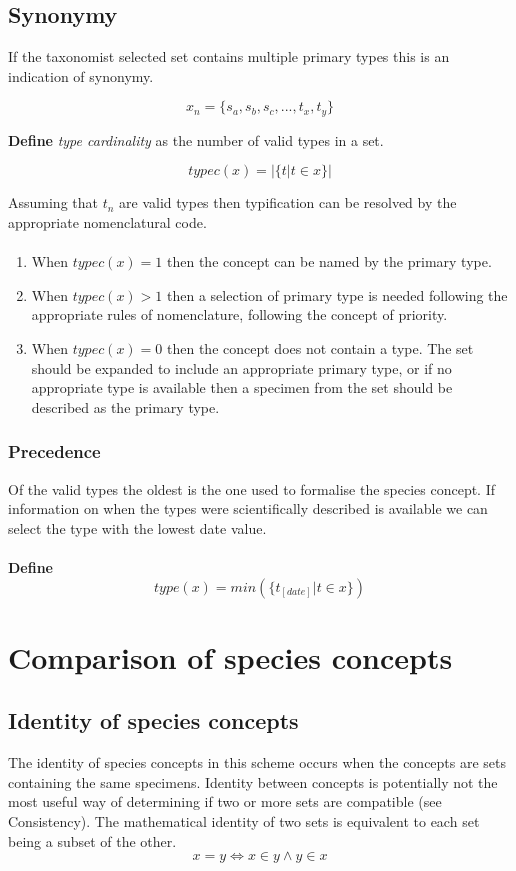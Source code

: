 \documentclass{article}
\begin{document}
   \subsection{Synonymy}
   If the taxonomist selected set contains multiple primary types this is an indication of synonymy.
   
   \[x_n = \{s_a, s_b, s_c, ..., t_x, t_y\}\]
   
   \textbf{Define} \textit{type cardinality} as the number of valid types in a set.
   
   \[typec(x) = \left|\{t|t \in x\}\right| \]
   
   Assuming that $t_n$ are valid types then typification can be resolved by the appropriate nomenclatural code.
   \paragraph{}
   \begin{enumerate}
   \item When $typec(x) = 1$ then the concept can be named by the primary type.
   \item When $typec(x) > 1$ then a selection of primary type is needed following the appropriate rules of nomenclature, following the concept of priority.
   \item When $typec(x) = 0$ then the concept does not contain a type. The set should be expanded to include an appropriate primary type, or if no appropriate type is available then a specimen from the set should be described as the primary type.
   \end{enumerate}
   
   \subsubsection{Precedence}
   Of the valid types the oldest is the one used to formalise the species concept. If information on when the types were scientifically described is available we can select the type with the lowest date value.
   \paragraph{}
   \textbf{Define}
   \[type(x) = min(\{t_{[date]}|t \in x\}) \]
   
   \section{Comparison of species concepts}
   \subsection{Identity of species concepts}
   The identity of species concepts in this scheme occurs when the concepts are sets containing the same specimens. Identity between concepts is potentially not the most useful way of determining if two or more sets are compatible (see Consistency). The mathematical identity of two sets is equivalent to each set being a subset of the other.
   \[x = y \iff x \in y \land y \in x\]
   
\end{document}
